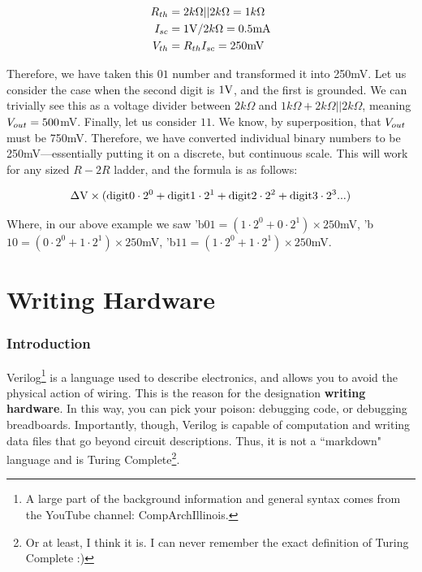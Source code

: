 \begin{equation}
\begin{split}
    R_{th} &= 2k\Omega || 2k\Omega = 1k\Omega \\
    I_{sc} &= 1{\rm V} / 2k\Omega = 0.5 \mathrm{mA}\\
    V_{th} &= R_{th}I_{sc} = 250\mathrm{mV}
\end{split}
\end{equation}

Therefore, we have taken this $01$ number and transformed it into 250mV. Let us consider the case when the second digit is $1{\rm V}$, and the first is grounded. We can trivially see this as a voltage divider between $2k\Omega$ and $1k\Omega + 2k\Omega || 2k\Omega$, meaning ${V}_{out} = 500$mV. Finally, let us consider $11$. We know, by superposition, that ${V}_{out}$ must be 750mV. Therefore, we have converted individual binary numbers to be 250mV---essentially putting it on a discrete, but continuous scale. This will work for any sized $R-2R$ ladder, and the formula is as follows: 

\begin{equation}
    \begin{split}
        \Delta {\rm V} \times (\mathrm{digit0} \cdot 2^0 + \mathrm{digit1} \cdot 2^1 + \mathrm{digit2} \cdot 2^2 + \mathrm{digit3} \cdot 2^3 ...)
    \end{split}
\end{equation}

Where, in our above example we saw 'b$01 = (1 \cdot 2^0 + 0\cdot 2^1) \times 250$mV, 'b$10 = (0 \cdot 2^0 + 1\cdot 2^1) \times 250$mV, 'b$11 = (1 \cdot 2^0 + 1\cdot 2^1) \times 250$mV.









\chapter{Writing Hardware}

\subsection{Introduction}

Verilog\footnote{A large part of the background information and general syntax comes from the YouTube channel: CompArchIllinois.} is a language used to describe electronics, and allows you to avoid the physical action of wiring. This is the reason for the designation \textbf{writing hardware}. In this way, you can pick your poison: debugging code, or debugging breadboards. Importantly, though, Verilog is capable of computation and writing data files that go beyond circuit descriptions. Thus, it is not a ``markdown" language and is Turing Complete\footnote{Or at least, I think it is. I can never remember the exact definition of Turing Complete :)}.\newline

